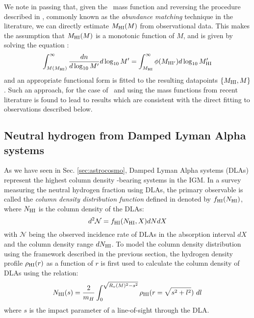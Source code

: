 We note in passing that, given the \HI\ mass function and reversing the procedure described in , commonly known as the \textit{abundance matching} technique in the literature, we can directly estimate $M_{\rm HI}(M)$ from observational data. This makes the assumption that $M_{\rm HI}(M)$ is a monotonic function of $M$, and is given by solving the equation \cite{vale2004}:
\begin{equation}
    \int_{M(M_{\rm HI})}^{\infty} \frac{dn}{d \log_{10} M'} d \log_{10} M' = \int_{M_{\rm HI}}^{\infty} \phi(M_{\rm HI'}) d \log_{10} M_{\rm HI}'
    \label{abmatchhi}
\end{equation}
and an appropriate functional form is fitted to the resulting datapoints $\{M_{\rm HI}, M\}$. Such an approach, for the case of \HI\ and using the mass functions from recent literature \cite{martin10, zwaan05} is found to lead to results which are consistent \cite{hpgk2017} with the direct fitting to observations described below.



\subsection{Neutral hydrogen  from Damped Lyman Alpha systems}
\label{sec:dlahimodels}

As we have seen in Sec. \ref{sec:astrocosmo}, Damped Lyman Alpha systems (DLAs) represent the highest column density \HI-bearing systems in the IGM.
In a survey measuring the neutral hydrogen fraction using DLAs, the primary observable is called the \textit{column density distribution function} defined in  denoted by $f_{\rm HI} (N_{\rm HI})$, where $N_{\rm HI}$ is the column density of the DLAs:
\begin{equation}
 d^2 \mathcal{N} = f_{\rm HI} (N_{\rm HI}, X) dN dX
\end{equation} 
with $\mathcal{N}$ being the observed incidence rate of DLAs in the absorption interval $dX$ and the column density range $dN_{\rm HI}$. 
To model the column density distribution using the framework described in the previous section, the hydrogen density profile $\rho_{\rm HI}(r)$ as a function of $r$ is first used to calculate the column density of DLAs using the relation:
\begin{equation}
 N_{\rm HI}(s) = \frac{2}{m_H} \int_0^{\sqrt{R_v(M)^2 - s^2}} \rho_{\rm HI} (r = \sqrt{s^2 + l^2}) \ dl 
 \label{coldenss}
\end{equation} 
where $s$ is the impact parameter of a line-of-sight through the DLA. 

